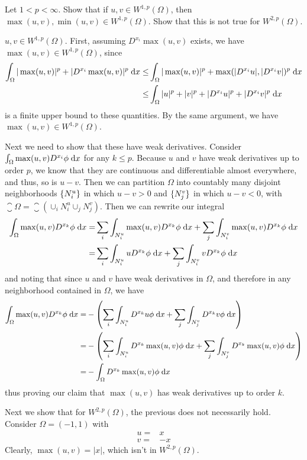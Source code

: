 Let $1 < p < \infty$. Show that if $u, v \in W^{1, p}(\Omega)$, then $\max(u, v), \min(u, v) \in W^{1, p}(\Omega)$.
Show that this is not true for $W^{2, p}(\Omega)$.

$u, v \in W^{1, p}(\Omega)$.
First, assuming $D^{x_i} \max(u, v)$ exists, we have $\max(u, v) \in W^{1,p}(\Omega)$, since
\begin{align*}
  \int_\Omega |\max(u, v)|^p + |D^{x_i} \max(u, v)|^p \;\mathrm{d}x \leq &\int_\Omega |\max(u, v)|^p + \max(|D^{x_i} u|, |D^{x_i} v|)^p \;\mathrm{d}x\\
  \leq &\int_\Omega |u|^p + |v|^p + |D^{x_i} u|^p + |D^{x_i} v|^p \;\mathrm{d}x
\end{align*}
is a finite upper bound to these quantities.
By the same argument, we have  $\max(u, v) \in W^{1,p}(\Omega)$.

Next we need to show that these have weak derivatives.
Consider $\int_\Omega \max(u, v) D^{x_i} \phi \;\mathrm{d}x$ for any $k \leq p$.
Because $u$ and $v$ have weak derivatives up to order $p$,
we know that they are continuous and differentiable almost everywhere, and thus, so is $u - v$.
Then we can partition $\Omega$ into countably many disjoint neighborhoods
$\{ N^u_i \}$ in which $u - v > 0$ and $\{ N^v_j \}$ in which $u - v < 0$,
with $\closure{\Omega} = \closure{(\cup_i N^u_i \cup_j N^v_j)}$.
Then we can rewrite our integral
\begin{align*}
\int_\Omega \max(u, v) D^{x_k} \phi \;\mathrm{d}x = &\sum_i \int_{N^u_i} \max(u, v) D^{x_k} \phi \;\mathrm{d}x
                                         + \sum_j \int_{N^v_i} \max(u, v) D^{x_k} \phi \;\mathrm{d}x\\
                                      = &\sum_i \int_{N^u_i} u D^{x_k} \phi \;\mathrm{d}x
                                         + \sum_j \int_{N^v_i} v D^{x_k} \phi \;\mathrm{d}x
\end{align*}
and noting that since $u$ and $v$ have weak derivatives in $\Omega$,
and therefore in any neighborhood contained in $\Omega$, we have
\begin{align*}
\int_\Omega \max(u, v) D^{x_k} \phi \;\mathrm{d}x
  = &-\left(\sum_i \int_{N^u_i} D^{x_k} u \phi \;\mathrm{d}x
            + \sum_j \int_{N^v_j}  D^{x_k} v \phi \;\mathrm{d}x\right)\\
  = &-\left(\sum_i \int_{N^u_i} D^{x_k} \max(u, v) \phi \;\mathrm{d}x
            + \sum_j \int_{N^v_j}  D^{x_k} \max(u, v) \phi \;\mathrm{d}x\right)\\
  = &-\int_{\Omega} D^{x_k} \max(u, v) \phi \;\mathrm{d}x
\end{align*}
thus proving our claim that $\max(u, v)$ has weak derivatives up to order $k$.

Next we show that for $W^{2,p}(\Omega)$, the previous does not necessarily hold.
Consider $\Omega = (-1, 1)$ with
\begin{align*}
  u = &x\\
  v = &-x
\end{align*}
Clearly, $\max(u, v) = |x|$, which isn't in $W^{2, p}(\Omega)$.
